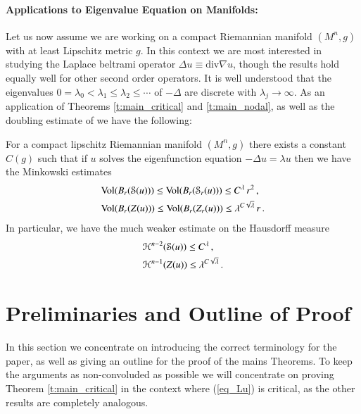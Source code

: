 \documentclass[11pt]{article}
\begin{document}
\paragraph{Applications to Eigenvalue Equation on Manifolds:}

Let us now assume we are working on a compact Riemannian manifold $(M^n,g)$ with at least Lipschitz metric $g$.  In this context we are most interested in studying the Laplace beltrami operator $\Delta u \equiv \text{div} \nabla u$, though the results hold equally well for other second order operators.  It is well understood that the eigenvalues $0=\lambda_0<\lambda_1\leq \lambda_2\leq \cdots$ of $-\Delta$ are discrete with $\lambda_j\to \infty$.  As an application of Theorems \ref{t:main_critical} and \ref{t:main_nodal}, as well as the doubling estimate of \cite{DonFef} we have the following:

\begin{theorem}
For a compact lipschitz Riemannian manifold $(M^n,g)$ there exists a constant $C(g)$ such that if $u$ solves the eigenfunction equation $-\Delta u = \lambda u$ then we have the Minkowski estimates
\begin{align}
&{\operatorname{Vol}}(B_r({\mathcal{S}}(u))) \leq {\operatorname{Vol}}(B_r({\mathcal{S}}_r(u))) \leq C^{\lambda}\,r^2\, ,\notag\\
&{\operatorname{Vol}}(B_r(Z(u))) \leq {\operatorname{Vol}}(B_r(Z_r(u))) \leq \lambda^{C\sqrt{\lambda}}\,r\, .
\end{align}
In particular, we have the much weaker estimate on the Hausdorff measure
\begin{align}
&{\mathcal{H}}^{n-2}({\mathcal{S}}(u))\leq C^{\lambda}\, ,\notag\\
&{\mathcal{H}}^{n-1}(Z(u))\leq \lambda^{C\sqrt{\lambda}}\, .
\end{align}

\end{theorem}

\section{Preliminaries and Outline of Proof}

In this section we concentrate on introducing the correct terminology for the paper, as well as giving an outline for the proof of the mains Theorems.  To keep the arguments as non-convoluded as possible we will concentrate on proving Theorem \ref{t:main_critical} in the context where (\ref{eq_Lu}) is critical, as the other results are completely analogous.
\end{document}
